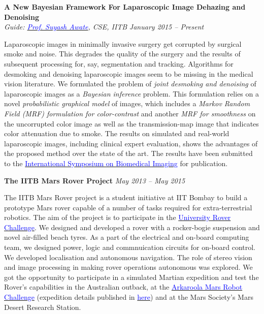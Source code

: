 \documentclass[margin,line]{res}
\newenvironment{list1}{
  \begin{list}{\ding{113}}{%
      \setlength{\itemsep}{0in}
      \setlength{\parsep}{0in} \setlength{\parskip}{0in}
      \setlength{\topsep}{0in} \setlength{\partopsep}{0in} 
      \setlength{\leftmargin}{0.17in}}}{\end{list}}
\begin{document}
\begin{resume}
{\bf A New Bayesian Framework For Laparoscopic Image Dehazing and Denoising} \\
{\em Guide: \href{https://www.cse.iitb.ac.in/~suyash}{\textcolor{blue}{Prof. Suyash Awate}}, CSE, IITB} \hfill {\it January 2015 -- Present}\\
\vspace*{-.13in}
\begin{list1}
\item[]
Laparoscopic images in minimally invasive surgery get corrupted by surgical smoke and noise. This degrades the quality of the surgery and the results of subsequent processing for, say, segmentation and tracking. Algorithms for desmoking and denoising laparoscopic images seem to be missing in the medical vision literature. We formulated the problem of {\em joint desmoking and denoising} of laparoscopic images as a {\em Bayesian inference} problem. This formulation relies on a novel {\em probabilistic graphical model} of images, which includes a {\em Markov Random Field (MRF) formulation for color-contrast} and another {\em MRF for smoothness} on the uncorrupted color image as well as the transmission-map image that indicates color attenuation due to smoke. The results on simulated and real-world laparoscopic images, including clinical expert evaluation, shows the advantages of the proposed method over the state of the art. The results have been submitted to the \href{http://biomedicalimaging.org/2016/}{\textcolor{blue} {International Symposium on Biomedical Imaging}} for publication.
\end{list1}

{\bf The IITB Mars Rover Project}
\hfill {\it May 2013 -- May 2015}\\
\vspace*{-.13in}
\begin{list1}
\item[]
The IITB Mars Rover project is a student initiative at IIT Bombay to build a prototype Mars rover capable of a number of tasks required for extra-terrestrial robotics. The aim of the project is to participate in the \href{urc.marssociety.org/}{\textcolor{blue} {University Rover Challenge}}. We designed and developed a rover with a rocker-bogie suspension and novel air-filled beach tyres. As a part of the electrical and on-board computing team, we designed power, logic and commnuication circuits for on-board control. We developed localisation and autonomous navigation. The role of stereo vision and image processing in making rover operations autonomous was explored. We got the opportunity to participate in a simulated Martian expedition and test the Rover's capabilities in the Australian outback, at the \href{http://marssociety.org.au/article/arkaroola-mars-robot-challenge-spaceward-bound-expedition}{\textcolor{blue} {Arkaroola Mars Robot Challenge}} (expedition details published in \href{http://www.nssa.com.au/14asrc/14ASRC-proceedings.zip}{\textcolor{blue} {here}}) and at the Mars Society's Mars Desert Research Station.
\end{list1}


\end{resume}
\end{document}

